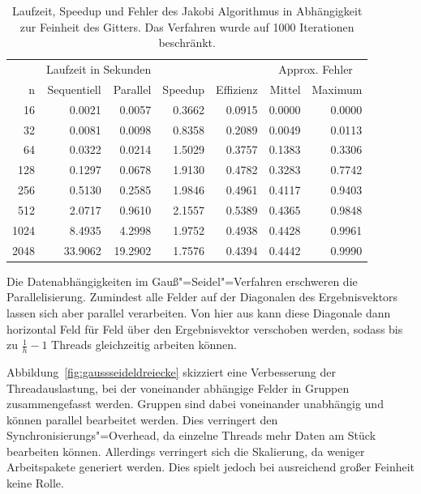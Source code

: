 \documentclass[paper = a4]{scrartcl}
\begin{document}
\begin{table}
    \centering
    \begin{tabular}{|r|r|r|r|r|r|r|} \hline
    & \multicolumn{2}{c|}{Laufzeit in Sekunden} & & & \multicolumn{2}{c|}{Approx. Fehler} \\
    n    & Sequentiell & Parallel & Speedup & Effizienz & Mittel & Maximum \\ \hline \hline
    16   & 0.0021      & 0.0057   & 0.3662  & 0.0915    & 0.0000 & 0.0000 \\
    32   & 0.0081      & 0.0098   & 0.8358  & 0.2089    & 0.0049 & 0.0113 \\
    64   & 0.0322      & 0.0214   & 1.5029  & 0.3757    & 0.1383 & 0.3306 \\
    128  & 0.1297      & 0.0678   & 1.9130  & 0.4782    & 0.3283 & 0.7742 \\
    256  & 0.5130      & 0.2585   & 1.9846  & 0.4961    & 0.4117 & 0.9403 \\
    512  & 2.0717      & 0.9610   & 2.1557  & 0.5389    & 0.4365 & 0.9848 \\
    1024 & 8.4935      & 4.2998   & 1.9752  & 0.4938    & 0.4428 & 0.9961 \\
    2048 & 33.9062     & 19.2902  & 1.7576  & 0.4394    & 0.4442 & 0.9990 \\ \hline
    \end{tabular}
    \caption{Laufzeit, Speedup und Fehler des Jakobi Algorithmus in Abhängigkeit zur Feinheit des Gitters. Das Verfahren wurde auf 1000 Iterationen beschränkt.}
    \label{tab:jakobi}
\end{table}

Die Datenabhängigkeiten im Gauß"=Seidel"=Verfahren erschweren die Parallelisierung. Zumindest alle Felder auf der Diagonalen des Ergebnisvektors lassen sich aber parallel verarbeiten. Von hier aus kann diese Diagonale dann horizontal Feld für Feld über den Ergebnisvektor verschoben werden, sodass bis zu \(\frac{1}{h} - 1\) Threads gleichzeitig arbeiten können.


Abbildung~\ref{fig:gaussseideldreiecke} skizziert eine Verbesserung der Threadauslastung, bei der voneinander abhängige Felder in Gruppen zusammengefasst werden. Gruppen sind dabei voneinander unabhängig und können parallel bearbeitet werden. Dies verringert den Synchronisierungs"=Overhead, da einzelne Threads mehr Daten am Stück bearbeiten können. Allerdings verringert sich die Skalierung, da weniger Arbeitspakete generiert werden. Dies spielt jedoch bei ausreichend großer Feinheit keine Rolle.
\end{document}
